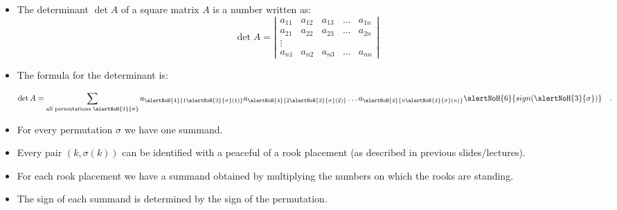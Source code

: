 \begin{frame}

\begin{itemize}
\item The determinant $\det A$ of a square matrix $A$ is a number written as:
\[
\det A= \left|\begin{array}{ccccc}
a_{11} & a_{12} & a_{13}& \dots & a_{1n}\\
a_{21} & a_{22} & a_{23}& \dots & a_{2n}\\
\vdots \\
a_{n1} & a_{n2} & a_{n3}& \dots & a_{nn}
\end{array} \right|
\]
\item<2-> The formula for the determinant is:

\[\det A=\sum_{\text{all permutations }\alertNoH{3}{\sigma}} a_{\alertNoH{4}{1\alertNoH{3}{\sigma}(1)}} a_{\alertNoH{4}{2\alertNoH{3}{\sigma}(2)}} \dots a_{\alertNoH{4}{n\alertNoH{3}{\sigma}(n)}} \alertNoH{6}{ sign(\alertNoH{3}{\sigma})} \quad .
\]
\item<3-> For every permutation $\sigma$ we have one summand.
\item<4-> Every pair $(k,\sigma(k))$ can be identified with a peaceful of a rook placement (as described in previous slides/lectures).
\item<5-> For each rook placement we have a summand obtained by multiplying the numbers on which the rooks are standing.
\item<6-> The sign of each summand is determined by the sign of the permutation.
\end{itemize}

\vskip 10cm
\end{frame}
